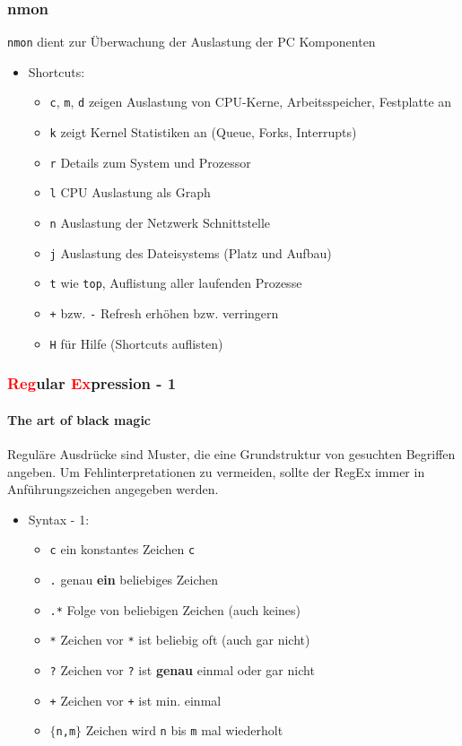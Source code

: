 \documentclass[12pt,utf8]{beamer}
\begin{document}
\begin{frame}
\frametitle{nmon}
\texttt{nmon} dient zur Überwachung der Auslastung der PC Komponenten
\begin{itemize}
	\item Shortcuts:
	\begin{itemize}[<+->]
		\item {\scriptsize \texttt{c}, \texttt{m}, \texttt{d} zeigen Auslastung von CPU-Kerne, Arbeitsspeicher, Festplatte an}
		\item {\scriptsize \texttt{k} zeigt Kernel Statistiken an (Queue, Forks, Interrupts)}
		\item {\scriptsize \texttt{r} Details zum System und Prozessor}
		\item {\scriptsize \texttt{l} CPU Auslastung als Graph}
		\item {\scriptsize \texttt{n} Auslastung der Netzwerk Schnittstelle}
		\item {\scriptsize \texttt{j} Auslastung des Dateisystems (Platz und Aufbau)}
		\item {\scriptsize \texttt{t} wie \texttt{top}, Auflistung aller laufenden Prozesse}
		\item {\scriptsize \texttt{+} bzw. \texttt{-} Refresh erhöhen bzw. verringern}
		\item {\scriptsize \texttt{H} für Hilfe (Shortcuts auflisten)}
	\end{itemize}
\end{itemize}
\end{frame}

\begin{frame}
\frametitle{\textcolor{red}{Reg}ular \textcolor{red}{Ex}pression - 1}
\framesubtitle{\textcolor{ownDarkOr}{The art of black magic}}
Reguläre Ausdrücke sind Muster, die eine Grundstruktur von gesuchten Begriffen angeben. Um Fehlinterpretationen zu vermeiden, sollte der RegEx immer in Anführungszeichen angegeben werden.
\begin{itemize}
	\item Syntax - 1:
	\begin{itemize}[<+->]
		\item {\scriptsize \texttt{c} ein konstantes Zeichen \texttt{c}}
		\item {\scriptsize \texttt{.} genau \textbf{ein} beliebiges Zeichen}
		\item {\scriptsize \texttt{.*} Folge von beliebigen Zeichen (auch keines)}
		\item {\scriptsize \texttt{*} Zeichen vor \texttt{*} ist beliebig oft (auch gar nicht)}
		\item {\scriptsize \texttt{?} Zeichen vor \texttt{?} ist \textbf{genau} einmal oder gar nicht}
		\item {\scriptsize \texttt{+} Zeichen vor \texttt{+} ist min. einmal}
		\item {\scriptsize \texttt{$\{$n,m$\}$} Zeichen wird \texttt{n} bis \texttt{m} mal wiederholt}
	\end{itemize}
\end{itemize}
\end{frame}
\end{document}
